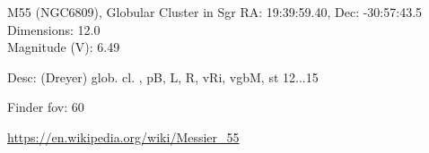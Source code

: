 \begin{block}{M55 (NGC6809), Globular Cluster in Sgr}
    RA: 19:39:59.40, Dec: -30:57:43.5 \\ 
    Dimensions: 12.0 \\ 
    Magnitude (V): 6.49


    Desc: (Dreyer) glob. cl. , pB, L, R, vRi, vgbM, st 12...15 

    Finder fov: 60 

    \url{https://en.wikipedia.org/wiki/Messier_55} 
\end{block}